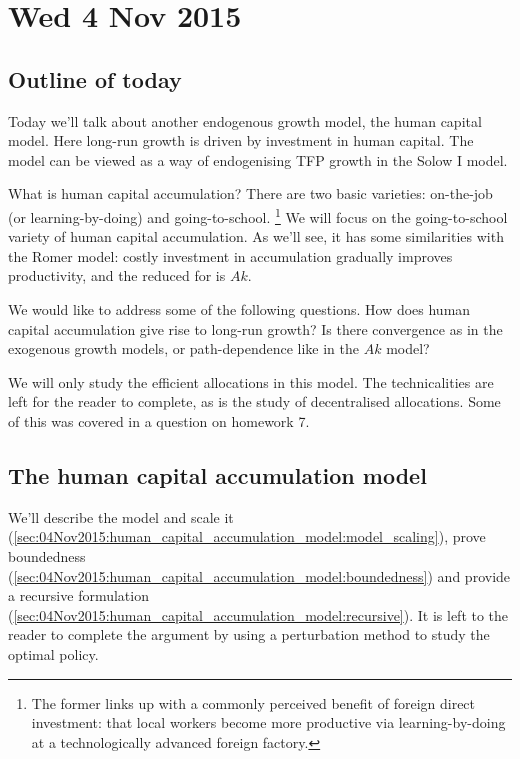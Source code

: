\documentclass[11pt,letterpaper,reqno,oneside]{article}
\begin{document}
\pagebreak
\section{Wed 4 Nov 2015}
\label{sec:04Nov2015}


\subsection{Outline of today}
\label{sec:04Nov2015:outline_of_today}

Today we'll talk about another endogenous growth model, the human capital model. Here long-run growth is driven by investment in human capital. The model can be viewed as a way of endogenising TFP growth in the Solow I model.

What is human capital accumulation? There are two basic varieties: on-the-job (or learning-by-doing) and going-to-school.%
	\footnote{The former links up with a commonly perceived benefit of foreign direct investment: that local workers become more productive via learning-by-doing at a technologically advanced foreign factory.}
We will focus on the going-to-school variety of human capital accumulation. As we'll see, it has some similarities with the Romer model: costly investment in accumulation gradually improves productivity, and the reduced for is $Ak$.

We would like to address some of the following questions. How does human capital accumulation give rise to long-run growth? Is there convergence as in the exogenous growth models, or path-dependence like in the $Ak$ model?

We will only study the efficient allocations in this model. The technicalities are left for the reader to complete, as is the study of decentralised allocations. Some of this was covered in a question on homework 7.



\subsection{The human capital accumulation model}
\label{sec:04Nov2015:human_capital_accumulation_model}

We'll describe the model and scale it (\cref{sec:04Nov2015:human_capital_accumulation_model:model_scaling}), prove boundedness (\cref{sec:04Nov2015:human_capital_accumulation_model:boundedness}) and provide a recursive formulation (\cref{sec:04Nov2015:human_capital_accumulation_model:recursive}). It is left to the reader to complete the argument by using a perturbation method to study the optimal policy.
\end{document}
